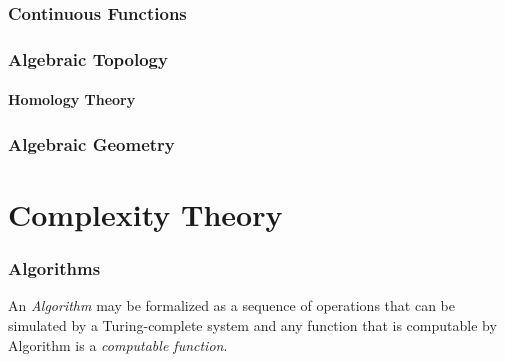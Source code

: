 \documentclass{article}
\begin{document}
\section{Continuous Functions}\label{sec:continuous_functions}

\section{Algebraic Topology}\label{sec:algebraic_topology}

\subsection{Homology Theory}\label{subsec:homology_theory}

\section{Algebraic Geometry}\label{sec:algebraic_geometry}


\part{Complexity Theory}

\section{Algorithms}

An \emph{Algorithm} may be formalized as a sequence of operations that
can be simulated by a Turing-complete system and any function
that is computable by Algorithm is a \emph{computable function}.

\end{document}
